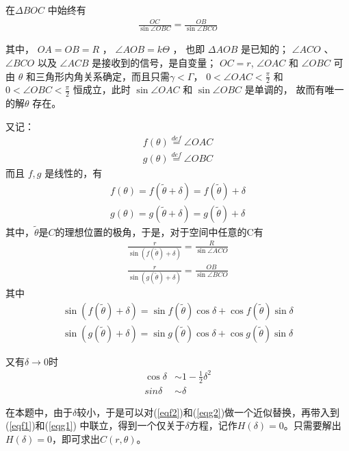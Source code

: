 \documentclass[UTF8]{ctexart}
\begin{document}
在\(\Delta BOC\) 中始终有
\begin{align}
    \frac{OC}{\sin{\angle OBC}} = \frac{OB}{\sin\angle BCO}
\end{align}

其中，
\(OA=OB=R\) ，
\(\angle AOB = k\Theta\) ，
也即 \(\Delta AOB\) 是已知的；
\(\angle ACO\) 、
\(\angle BCO\) 以及
\(\angle ACB\) 是接收到的信号，是自变量；
\(OC=r\),  
\(\angle OAC\) 和 \(\angle OBC\)
可由 \(\theta\) 和三角形内角关系确定，而且只需\(\gamma<\Gamma\)，
\(0< \angle OAC < \frac{\pi}{2}\)
和
\(0< \angle OBC<\frac{\pi}{2} \)
恒成立，此时
\(\sin\angle OAC\) 和 \(\sin\angle OBC\) 是单调的，
故而有唯一的解\(\theta\) 存在。

又记：
\begin{align}
    f(\theta)\overset{def}{=}\angle OAC \\
    g(\theta)\overset{def}{=}\angle OBC
\end{align}
而且 \(f,g\) 是线性的，有
\begin{align*}
    f(\theta) = f(\tilde{\theta}+\delta)=f(\tilde{\theta})+\delta \\
    g(\theta) = g(\tilde{\theta}+\delta) = g(\tilde{\theta})+\delta
\end{align*}
其中，\(\tilde{\theta}\)是\(C\)的理想位置的极角，于是，对于空间中任意的C有
\begin{align}
    \frac{r}{\sin(f(\tilde{\theta})+\delta)} = \frac{R}{\sin\angle ACO} \label{eqf1} \\
    \frac{r}{\sin(g(\tilde{\theta})+\delta)} = \frac{OB}{\sin\angle BCO} \label{eqg1}
\end{align}
其中
\begin{align}
    \sin(f(\tilde{\theta})+\delta)=\sin f(\tilde{\theta}) \cos\delta+\cos f(\tilde{\theta})\sin\delta \label{eqf2} \\
    \sin(g(\tilde{\theta})+\delta)=\sin g(\tilde{\theta}) \cos\delta+\cos g(\tilde{\theta})\sin\delta \label{eqg2}
\end{align}

又有\(\delta\rightarrow 0 \)时
\begin{align*}
    \cos\delta & \sim 1-\frac{1}{2}\delta^2 \\
    sin\delta  & \sim \delta
\end{align*}

在本题中，由于\(\delta\)较小，于是可以对(\ref{eqf2})和(\ref{eqg2})做一个近似替换，再带入到(\ref{eqf1})和(\ref{eqg1}) 中联立，得到一个仅关于\(\delta\)方程，记作\(H(\delta)= 0 \)。只需要解出\(H(\delta)=0\)，即可求出\(C(r,\theta)\)。
\end{document}
